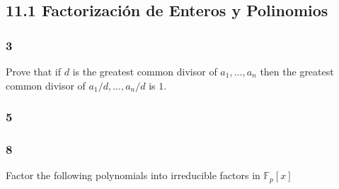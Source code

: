 \documentclass[11pt]{article}
\newcommand{\set}[1]{\mathbb{#1}}
\theoremstyle{definition}
\begin{document}
        \subsection{11.1 Factorización de Enteros y Polinomios}
        \subsubsection{3}
        Prove that if $d$ is the greatest common divisor of $a_1,...,a_n$ then the greatest common divisor of $a_1/d,...,a_n/d$ is $1$.

        \subsubsection{5}

        \subsubsection{8}
        Factor the following polynomials into irreducible factors in $\set{F}_p[x]$
    
\end{document}
